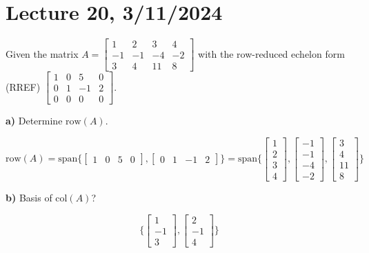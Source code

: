 \documentclass{article}
\begin{document}
\section{Lecture 20, 3/11/2024}



Given the matrix \( A = \begin{bmatrix} 1 & 2 & 3 & 4 \\ -1 & -1 & -4 & -2 \\ 3 & 4 & 11 & 8 \end{bmatrix} \) with the row-reduced echelon form (RREF) \( \begin{bmatrix} 1 & 0 & 5 & 0 \\ 0 & 1 & -1 & 2 \\ 0 & 0 & 0 & 0 \end{bmatrix} \).

\textbf{a)} Determine \( \text{row}(A) \).

\[
\text{row}(A) = \text{span} \{ \begin{bmatrix} 1 & 0 & 5 & 0 \end{bmatrix}, \begin{bmatrix} 0 & 1 & -1 & 2 \end{bmatrix} \} = \text{span} \{ \begin{bmatrix} 1 \\ 2 \\ 3 \\ 4 \end{bmatrix}, \begin{bmatrix} -1 \\ -1 \\ -4 \\ -2 \end{bmatrix}, \begin{bmatrix} 3 \\ 4 \\ 11 \\ 8 \end{bmatrix} \}
\]

\textbf{b)} Basis of \( \text{col}(A) \)?

\[ \{ \begin{bmatrix} 1 \\ -1 \\ 3 \end{bmatrix}, \begin{bmatrix} 2 \\ -1 \\ 4 \end{bmatrix} \} \]
\end{document}
